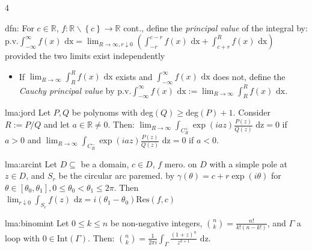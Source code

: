 \documentclass[landscape, 8pt]{extarticle}
\begin{document}
\begin{multicols*}{4}
		
		\begin{dfn}{dfn:}{ }
			For $c \in \mathbb{R}$, $f: \mathbb{R} \backslash \left\{c\right\} \to \mathbb{R}$ cont., define the \textit{principal value} of the integral by:\\
			p.v.$\int_{-\infty}^{\infty}f(x) \text{ dx} = \lim_{R\to \infty, r \downarrow 0} \left(\int_{-r}^{c-r}f(x) \text{ dx} + \int_{c + r}^{R} f(x) \text{ dx}\right)$ provided the two limits exist independently
			\begin{itemize}
			\item If $\lim_{R\to \infty} \int_{R}^{R}f(x) \text{ dx}$ exists and $\int_{-\infty}^{\infty} f(x) \text{ dx}$ does not, define the \textit{Cauchy principal value} by p.v.$\int_{-\infty}^{\infty} f(x) \text{ dx} := \lim_{R\to \infty} \int_{R}^{R}f(x) \text{ dx}$.
			\end{itemize}
			
			
		\end{dfn}
		
		
		\begin{lma}{lma:jord}{ }
			Let $P, Q$ be polynoms with deg$(Q) \ge$deg$(P) + 1$. Consider $R := P/Q$ and let $a \in \mathbb{R} \ne 0$. Then: $\lim_{R\to \infty} \int_{C_R^+} \exp(iaz) \frac{P(z)}{Q(z)} \text{ dz} =0$ if $a > 0$ and $\lim_{R\to \infty} \int_{C_R^-} \exp(iaz) \frac{P(z)}{Q(z)} \text{ dz} =0$ if $a < 0$.
			
			
		\end{lma}
		
		
		\begin{lma}{lma:arcint}{ }
			Let $D \subseteq $ be a domain, $c \in D$, $f$ mero. on $D$ with a simple pole at $z \in D$, and $S_r$ be the circular arc paremed. by $\gamma(\theta) = c + r \exp(i\theta)$ for $\theta \in [\theta_0,\theta_1], 0 \le\theta_0 <\theta_1 \le 2 \pi$. Then $\lim_{r \downarrow 0} \int_{S_r} f(z) \text{ dz} = i(\theta_1 -\theta_0) \text{Res}(f, c)$
			
			
			
		\end{lma}
		
		
		\begin{lma}{lma:binomint}{ }
			Let $0 \le k \le n$ be non-negative integers, $\binom{n}{k} = \frac{n!}{k!(n-k!)}$, and $\Gamma$ a loop with $0 \in \text{Int}(\Gamma)$. Then: $\binom{n}{k} = \frac{1}{2 \pi i} \int_{\Gamma} \frac{(1+z)^n}{z^{k+1}} \text{ dz}$.
			
			
		\end{lma}
		

\end{multicols*}
\end{document}
